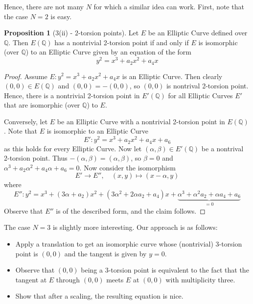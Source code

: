 \documentclass{scrartcl}
\newcommand{\Q}{\mathbb{Q}}
\theoremstyle{definition}
\newtheorem{prop}[subsection]{Proposition}
\begin{document}
Hence, there are not many $N$ for which a similar idea can work.
First, note that the case $N = 2$ is easy.
\begin{prop}[3(ii) - $2$-torsion points]
    Let $E$ be an Elliptic Curve defined over $\Q$.
    Then $E(\Q)$ has a nontrivial 2-torsion point if and only if $E$ is isomorphic (over $\Q$) to an Elliptic Curve given by an equation of the form
    \begin{equation*}
        y^2 = x^3 + a_2 x^2 + a_4 x
    \end{equation*}
\end{prop}
\begin{proof}
    Assume $E: y^2 = x^3 + a_2 x^2 + a_4 x$ is an Elliptic Curve.
    Then clearly $(0, 0) \in E(\Q)$ and $(0, 0) = -(0, 0)$, so $(0, 0)$ is nontrival 2-torsion point.
    Hence, there is a nontrivial 2-torsion point in $E'(\Q)$ for all Elliptic Curves $E'$ that are isomorphic (over $\Q$) to $E$.

    Conversely, let $E$ be an Elliptic Curve with a nontrivial 2-torsion point in $E(\Q)$.
    Note that $E$ is isomorphic to an Elliptic Curve 
    \begin{equation*}
        E': y^2 = x^3 + a_2 x^2 + a_4 x + a_6
    \end{equation*}
    as this holds for every Elliptic Curve.
    Now let $(\alpha, \beta) \in E'(\Q)$ be a nontrival 2-torsion point.
    Thus $-(\alpha, \beta) = (\alpha, \beta)$, so $\beta = 0$ and $\alpha^3 + a_2 \alpha^2 + a_4 \alpha + a_6 = 0$.
    Now consider the isomorphism
    \begin{equation*}
        E' \to E'', \quad (x, y) \mapsto (x - \alpha, y)
    \end{equation*}
    where
    \begin{equation*}
        E'': y^2 = x^3 + (3\alpha + a_2) x^2 + (3\alpha^2 + 2\alpha a_2 + a_4)x + \underbrace{\alpha^3 + \alpha^2a_2 + \alpha a_4 + a_6}_{= 0}
    \end{equation*}
    Observe that $E''$ is of the described form, and the claim follows. 
\end{proof}
The case $N = 3$ is slightly more interesting.
Our approach is as follows:
\begin{itemize}
    \item Apply a translation to get an isomorphic curve whose (nontrivial) 3-torsion point is $(0, 0)$ and the tangent is given by $y = 0$.
    \item Observe that $(0, 0)$ being a 3-torsion point is equivalent to the fact that the tangent at $E$ through $(0, 0)$ meets $E$ at $(0, 0)$ with multiplicity three.
    \item Show that after a scaling, the resulting equation is nice.
\end{itemize}
\end{document}
